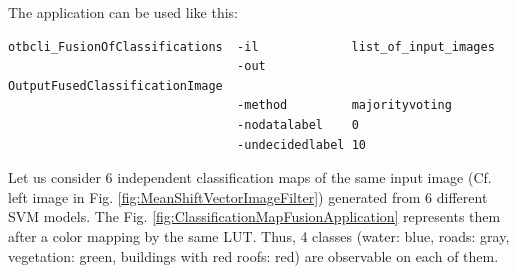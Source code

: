 The application can be used like this:
\begin{verbatim}
otbcli_FusionOfClassifications  -il             list_of_input_images
                                -out            OutputFusedClassificationImage
                                -method         majorityvoting
                                -nodatalabel    0
                                -undecidedlabel 10
\end{verbatim}


Let us consider 6 independent classification maps of the same input image (Cf. left 
image in Fig. \ref{fig:MeanShiftVectorImageFilter}) generated from 6 different SVM 
models. The Fig. \ref{fig:ClassificationMapFusionApplication} represents them after 
a color mapping by the same LUT. Thus, 4 classes (water: blue, roads: gray, 
vegetation: green, buildings with red roofs: red) are observable on each of them.



